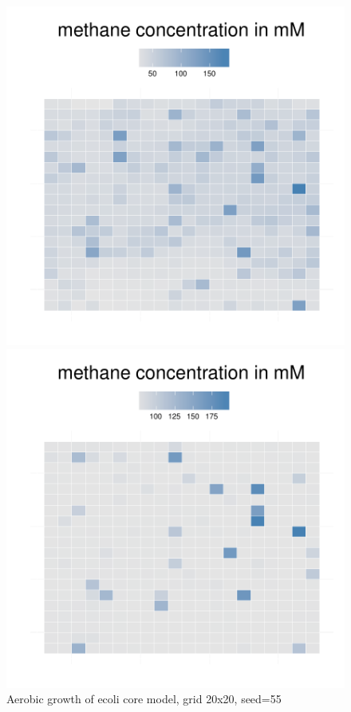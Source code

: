 \begin{figure}[h]
{\begin{minipage}[t]{0.3\textwidth}
  \end{minipage}
  \begin{minipage}[t]{0.3\textwidth}
    \includegraphics[width=\textwidth]{../results/barkeri_ecoli_20x20_seed4612_meth100.pdf}
  \end{minipage}
  \begin{minipage}[t]{0.3\textwidth}
    \includegraphics[width=\textwidth]{../results/barkeri_ecoli_20x20_seed4612_meth150.pdf}
  \end{minipage}
  }
  \caption{Aerobic growth of ecoli core model, grid 20x20, seed=55}
\end{figure}

